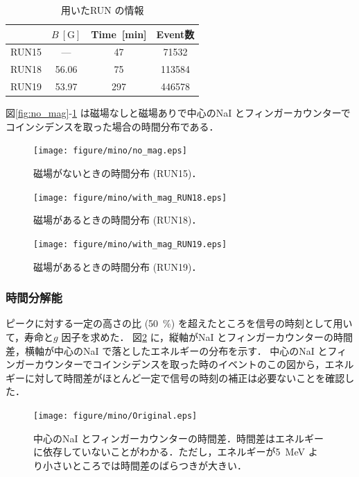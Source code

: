 \begin{table}[H]%
\caption{用いたRUN の情報}
\centering
\begin{tabular}{cccc}\toprule
{} & $B~[\mathrm{G}]$ & Time~[min] & Event数\\ \midrule
RUN15 & --- & 47 & 71532 \\
RUN18 & 56.06 & 75 & 113584 \\
RUN19 & 53.97 & 297 & 446578 \\ \bottomrule
\end{tabular}
\label{tab:RUN_info}
\end{table}

図\ref{fig:no_mag}-\ref{fig:with_mag_RUN19} は磁場なしと磁場ありで中心のNaI とフィンガーカウンターでコインシデンスを取った場合の時間分布である．
\begin{figure}[H]
\centering
\texttt{[image: figure/mino/no\_mag.eps]}
\caption{磁場がないときの時間分布 (RUN15)．}
\label{fig:no_mag}
\begin{minipage}{0.45\hsize}
\centering
\texttt{[image: figure/mino/with\_mag\_RUN18.eps]}
\caption{磁場があるときの時間分布 (RUN18)．}
\end{minipage}
\begin{minipage}{0.45\hsize}
\centering
\texttt{[image: figure/mino/with\_mag\_RUN19.eps]}
\caption{磁場があるときの時間分布 (RUN19)．}
\label{fig:with_mag_RUN19}
\end{minipage}
\end{figure}


\subsubsection{時間分解能}
ピークに対する一定の高さの比 (50~\%) を超えたところを信号の時刻として用いて，寿命と$g$ 因子を求めた．
図\ref{fig:Original} に，縦軸がNaI とフィンガーカウンターの時間差，横軸が中心のNaI で落としたエネルギーの分布を示す．
中心のNaI とフィンガーカウンターでコインシデンスを取った時のイベントのこの図から，エネルギーに対して時間差がほとんど一定で信号の時刻の補正は必要ないことを確認した．

\begin{figure}[H]%
\centering
\texttt{[image: figure/mino/Original.eps]}
\caption{中心のNaI とフィンガーカウンターの時間差．時間差はエネルギーに依存していないことがわかる．ただし，エネルギーが5~MeV より小さいところでは時間差のばらつきが大きい．}
\label{fig:Original}
\end{figure}

